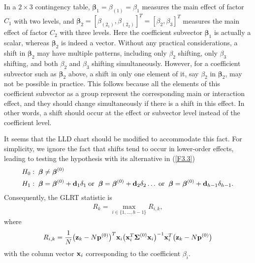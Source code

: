 In a $2\times 3$ contingency table, $\bm\beta_1=\beta_{(1)}=\beta_1$ measures the
main effect of factor $C_1$ with two levels, and
$\bm\beta_2=[\beta_{(2_1)},\beta_{(2_2)}]^T=[\beta_2,\beta_3]^T$ measures the main
effect of factor $C_2$ with three levels. Here the coefficient subvector
$\bm\beta_1$ is actually a scalar, whereas $\bm\beta_2$ is indeed a vector. Without
any practical considerations, a shift in $\bm\beta_2$ may have multiple patterns,
including only $\beta_2$ shifting, only $\beta_3$ shifting, and both $\beta_2$ and
$\beta_3$ shifting simultaneously. However, for a coefficient subvector such as
$\bm\beta_2$ above, a shift in only one element of it, say $\beta_2$ in
$\bm\beta_2$, may not be possible in practice. This follows because all the elements
of this coefficient subvector as a group represent the corresponding main or
interaction effect, and they should change simultaneously if there is a shift in
this effect. In other words, a shift should occur at the effect or subvector level
instead of the coefficient level.

It seems that the LLD chart should be modified to accommodate this fact. For
simplicity, we ignore the fact that shifts tend to occur in lower-order effects,
leading to testing the hypothesis with its alternative in (\ref{F3.3})
\begin{align*}
&H_0:\;\boldsymbol{\beta}\neq\boldsymbol\beta^{(0)}\\
&H_1:\;\boldsymbol{\beta}=\boldsymbol{\beta}^{(0)}+{\bf d}_1\delta_1
\;\mathrm{or}\;\;\boldsymbol{\beta}=\boldsymbol{\beta}^{(0)}+{\bf d}_2\delta_2\ldots\;
\mathrm{or}\;\;\boldsymbol{\beta}=\boldsymbol{\beta}^{(0)}+{\bf d}_{h-1}\delta_{h-1}.
\end{align*}
Consequently, the GLRT statistic is
\begin{align}
R_k=\max_{i\in\{1,\ldots,h-1\}}R_{i,k},\label{F3.13}
\end{align}
where
\[
R_{i,k}=\frac{1}{N}\big({\bf z}_k-N{\bf p}^{(0)}\big)^T{\bf x}_i\big({\bf
x}_i^T\boldsymbol{\Sigma}^{(0)}{\bf x}_i\big)^{-1}{\bf x}_i^T\big({\bf z}_k-N{\bf
p}^{(0)}\big)
\]
with the column vector ${\bf x}_i$ corresponding to the coefficient $\beta_i$.


